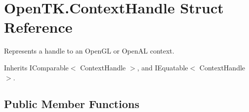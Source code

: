 \hypertarget{struct_open_t_k_1_1_context_handle}{\section{Open\-T\-K.\-Context\-Handle Struct Reference}
\label{struct_open_t_k_1_1_context_handle}
}


Represents a handle to an Open\-G\-L or Open\-A\-L context.  




Inherits I\-Comparable$<$ Context\-Handle $>$, and I\-Equatable$<$ Context\-Handle $>$.

\subsection*{Public Member Functions}
